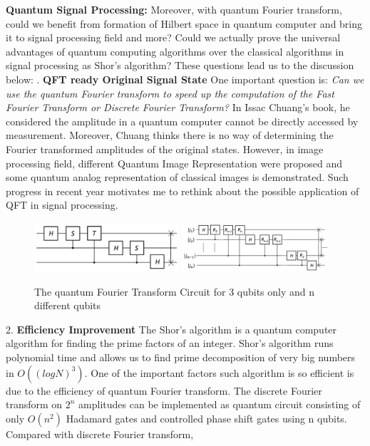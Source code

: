 \documentclass{article}
\begin{document}
\textbf{Quantum Signal Processing:} 
Moreover, with quantum Fourier transform, could we benefit from 
formation of Hilbert space in quantum computer and bring it to 
signal processing field and more? Could we actually prove the 
universal advantages of quantum computing algorithms over the 
classical algorithms in signal processing as Shor's algorithm? 
These questions lead us to the discussion below: . \textbf{QFT ready Original Signal State } One important question is:
\textit{
Can we use the quantum Fourier transform to speed up the 
computation of the Fast Fourier Transform or Discrete Fourier Transform?} 
In Issac Chuang's book, he considered the amplitude in a quantum 
computer cannot be directly accessed by measurement. Moreover, Chuang 
thinks there is no way of determining the Fourier transformed 
amplitudes of the original states. However, in image processing field, 
different Quantum Image Representation were proposed and some quantum analog 
representation of classical images is demonstrated. Such progress in recent 
year motivates me to rethink about the possible application of QFT in 
signal processing.\newline
\begin{figure}[h]
  \includegraphics[width=0.48\textwidth]{qft2.png}
  \includegraphics[width=0.48\textwidth]{qft1.png}
  \caption{The quantum Fourier Transform Circuit for 3 qubits only and 
  n different qubits}
\end{figure}
2. \textbf{Efficiency Improvement} The Shor's algorithm is a 
quantum computer algorithm for finding the prime factors of an integer. 
Shor's algorithm runs polynomial time and allows us to find prime decomposition of very big 
numbers in $O ((log N)^3)$. One of the important factors such algorithm is so efficient is 
due to the efficiency of quantum Fourier transform. The discrete Fourier transform on 
$2^n$ amplitudes can be implemented as quantum circuit consisting of only $O(n^2)$ Hadamard gates
and controlled phase shift gates using n qubits. Compared with discrete Fourier transform, 
\end{document}
